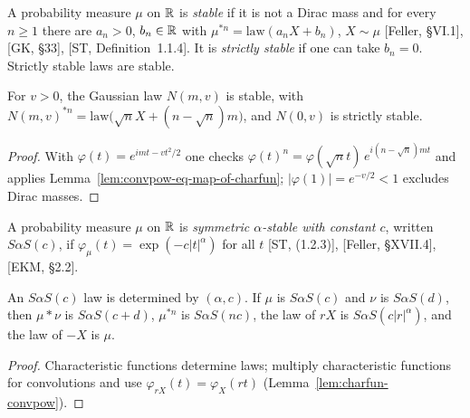 \begin{definition}
  \label{def:stable}
  \leanok
  A probability measure $\mu$ on $\mathbb{R}$ is \emph{stable} if it is not a Dirac mass and for every
  $n \ge 1$ there are $a_n > 0$, $b_n \in \mathbb{R}$ with $\mu^{*n} = \mathrm{law}(a_n X + b_n)$,
  $X \sim \mu$ [Feller, \S VI.1], [GK, \S33], [ST, Definition~1.1.4]. It is \emph{strictly
  stable} if one can take $b_n = 0$. Strictly stable laws are stable.
\end{definition}

\begin{proposition}
  \label{prop:gaussian-stable}
  \leanok
  For $v > 0$, the Gaussian law $N(m, v)$ is stable, with
  $N(m, v)^{*n} = \mathrm{law}\big( \sqrt{n} X + (n - \sqrt{n}) m \big)$, and $N(0, v)$ is
  strictly stable.
\end{proposition}
\begin{proof}
  \leanok
  With $\varphi(t) = e^{imt - vt^2/2}$ one checks $\varphi(t)^n = \varphi(\sqrt{n} t) \,
  e^{i (n - \sqrt n) m t}$ and applies Lemma~\ref{lem:convpow-eq-map-of-charfun}; $|\varphi(1)| =
  e^{-v/2} < 1$ excludes Dirac masses.
\end{proof}

\begin{definition}
  \label{def:symm-stable}
  \leanok
  A probability measure $\mu$ on $\mathbb{R}$ is \emph{symmetric $\alpha$-stable with constant $c$},
  written $S\alpha S(c)$, if $\varphi_\mu(t) = \exp(-c |t|^\alpha)$ for all $t$
  [ST, (1.2.3)], [Feller, \S XVII.4], [EKM, \S2.2].
\end{definition}

\begin{lemma}
  \label{lem:symm-stable-closure}
  \leanok
  An $S\alpha S(c)$ law is determined by $(\alpha, c)$. If $\mu$ is $S\alpha S(c)$ and $\nu$ is
  $S\alpha S(d)$, then $\mu * \nu$ is $S\alpha S(c + d)$, $\mu^{*n}$ is $S\alpha S(nc)$, the law
  of $rX$ is $S\alpha S(c |r|^\alpha)$, and the law of $-X$ is $\mu$.
\end{lemma}
\begin{proof}
  \leanok
  Characteristic functions determine laws; multiply characteristic functions for convolutions
  and use $\varphi_{rX}(t) = \varphi_X(rt)$ (Lemma~\ref{lem:charfun-convpow}).
\end{proof}

